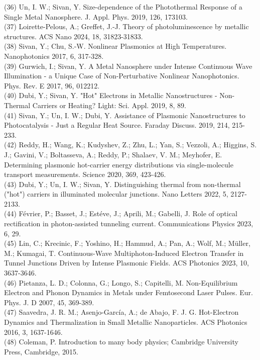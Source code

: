 \documentclass[10pt]{article}
\begin{document}
(36) Un, I. W.; Sivan, Y. Size-dependence of the Photothermal Response of a Single Metal Nanosphere. J. Appl. Phys. 2019, 126, 173103.\\
(37) Loirette-Pelous, A.; Greffet, J.-J. Theory of photoluminescence by metallic structures. ACS Nano 2024, 18, 31823-31833.\\
(38) Sivan, Y.; Chu, S.-W. Nonlinear Plasmonics at High Temperatures. Nanophotonics 2017, 6, 317-328.\\
(39) Gurwich, I.; Sivan, Y. A Metal Nanosphere under Intense Continuous Wave Illumination - a Unique Case of Non-Perturbative Nonlinear Nanophotonics. Phys. Rev. E 2017, 96, 012212.\\
(40) Dubi, Y.; Sivan, Y. "Hot" Electrons in Metallic Nanostructures - Non-Thermal Carriers or Heating? Light: Sci. Appl. 2019, 8, 89.\\
(41) Sivan, Y.; Un, I. W.; Dubi, Y. Assistance of Plasmonic Nanostructures to Photocatalysis - Just a Regular Heat Source. Faraday Discuss. 2019, 214, 215-233.\\
(42) Reddy, H.; Wang, K.; Kudyshev, Z.; Zhu, L.; Yan, S.; Vezzoli, A.; Higgins, S. J.; Gavini, V.; Boltasseva, A.; Reddy, P.; Shalaev, V. M.; Meyhofer, E. Determining plasmonic hot-carrier energy distributions via single-molecule transport measurements. Science 2020, 369, 423-426.\\
(43) Dubi, Y.; Un, I. W.; Sivan, Y. Distinguishing thermal from non-thermal ("hot") carriers in illuminated molecular junctions. Nano Letters 2022, 5, 2127-2133.\\
(44) Février, P.; Basset, J.; Estéve, J.; Aprili, M.; Gabelli, J. Role of optical rectification in photon-assisted tunneling current. Communications Physics 2023, 6, 29.\\
(45) Lin, C.; Krecinic, F.; Yoshino, H.; Hammud, A.; Pan, A.; Wolf, M.; Müller, M.; Kumagai, T. Continuous-Wave Multiphoton-Induced Electron Transfer in Tunnel Junctions Driven by Intense Plasmonic Fields. ACS Photonics 2023, 10, 3637-3646.\\
(46) Pietanza, L. D.; Colonna, G.; Longo, S.; Capitelli, M. Non-Equilibrium Electron and Phonon Dynamics in Metals under Femtosecond Laser Pulses. Eur. Phys. J. D 2007, 45, 369-389.\\
(47) Saavedra, J. R. M.; Asenjo-García, A.; de Abajo, F. J. G. Hot-Electron Dynamics and Thermalization in Small Metallic Nanoparticles. ACS Photonics 2016, 3, 1637-1646.\\
(48) Coleman, P. Introduction to many body physics; Cambridge University Press, Cambridge, 2015.\\
\end{document}
